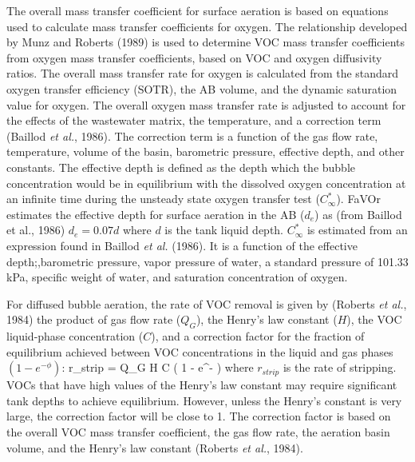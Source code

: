 The overall mass transfer coefficient for surface aeration is based on
equations used to calculate mass transfer coefficients for oxygen.  The
relationship developed by Munz and Roberts (1989) is used to determine VOC mass
transfer coefficients from oxygen mass transfer coefficients, based on VOC and
oxygen diffusivity ratios.  The  overall mass transfer rate for oxygen is
calculated from the standard oxygen transfer efficiency (SOTR), the AB volume,
and the dynamic saturation value for oxygen.  The overall oxygen mass transfer
rate is adjusted to account for the effects of the wastewater matrix, the
temperature, and a correction term (Baillod  {\it et al.}, 1986). The
correction term is a function of the gas flow rate, temperature, volume of the
basin, barometric pressure, effective depth, and other constants.  The
effective depth is defined as the depth which the bubble concentration would be
in equilibrium with the dissolved oxygen concentration at an infinite time
during the unsteady state oxygen transfer test ($C_{\infty}^{\ast}$).  FaVOr
estimates the effective depth for surface aeration in the AB ($d_e$) as (from
Baillod et al., 1986) $ d_e = 0.07 d $ where $d$ is the tank liquid depth.
$C_{\infty}^{\ast}$ is estimated from an expression found in Baillod {\it et
al.} (1986).  It is a function of the effective depth;,barometric pressure,
vapor pressure of water, a standard pressure of 101.33 kPa, specific weight of
water, and saturation concentration of oxygen.



For diffused bubble aeration, the rate of VOC removal is given by (Roberts {\it
et al.}, 1984) the product of gas flow rate ($Q_G$), the Henry's law constant
($H$), the VOC liquid-phase concentration ($C$), and a correction factor for
the fraction of equilibrium achieved between VOC concentrations in the liquid
and gas phases $(1 - e^{- \phi})$:
\mb
r_{strip} = Q_G H C \left( 1 - e^{- \phi} \right)
\mef
where $r_{strip}$ is the rate of stripping.  VOCs that have high values of the
Henry's law constant may require significant tank depths to achieve
equilibrium.  However, unless the Henry's constant is very large, the
correction factor will be close to 1.  The correction factor is based on the
overall VOC mass transfer coefficient, the gas flow rate, the aeration basin
volume, and the Henry's law constant (Roberts {\it et al.}, 1984).  

